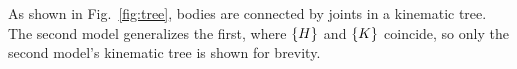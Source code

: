 As shown in Fig.~\ref{fig:tree}, bodies are connected by joints in a kinematic tree. The second model generalizes the first, where $\left\{H\right\}$ and $\left\{K\right\}$ coincide, so only the second model's kinematic tree is shown for brevity.
%
%
%


